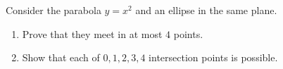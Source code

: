 Consider the parabola $y=x^2$ and an ellipse in the same plane.
\begin{enumerate}
\item[(a)] Prove that they meet in at most $4$ points.
\item[(b)] Show that each of $0,1,2,3,4$ intersection points is possible.
\end{enumerate}
